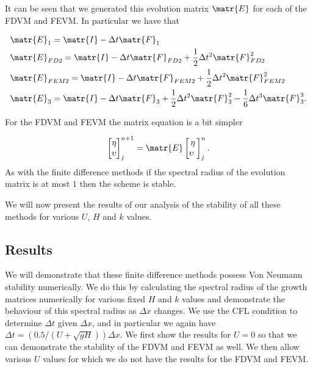 It can be seen that we generated this evolution matrix $\matr{E}$ for each of the FDVM and FEVM. In particular we have that

\begin{align*}
&\matr{E}_{1} = \matr{I} - \Delta t \matr{F}_1 \\
&\matr{E}_{FD2} = \matr{I} - \Delta t \matr{F}_{FD2} + \frac{1}{2} \Delta t^2 \matr{F}_{FD2}^2 \\
&\matr{E}_{FEM2} =  \matr{I} - \Delta t \matr{F}_{FEM2} + \frac{1}{2} \Delta t^2 \matr{F}_{FEM2}^2\\
&\matr{E}_{3} = \matr{I} - \Delta t \matr{F}_{3} + \frac{1}{2} \Delta t^2 \matr{F}_3^2 - \frac{1}{6} \Delta t^3 \matr{F}_3^3. \\
\end{align*}

For the FDVM and FEVM the matrix equation is a bit simpler

\begin{equation}
\begin{bmatrix}
\eta \\
\upsilon\\
\end{bmatrix}^{n+1}_j = \matr{E}  \begin{bmatrix}
\eta\\
\upsilon\
\end{bmatrix}^{n}_j .
\end{equation}
As with the finite difference methods if the spectral radius of the evolution matrix is at most $1$ then the scheme is stable.

We will now present the results of our analysis of the stability of all these methods for various $U$, $H$ and $k$ values. 

\subsection{Results}
We will demonstrate that these finite difference methods possess Von Neumann stability numerically. We do this by calculating the spectral radius of the growth matrices numerically for various fixed $H$ and $k$ values and demonstrate the behaviour of this spectral radius as $\Delta x$ changes. We use the CFL condition to determine $\Delta t$ given $\Delta x$, and in particular we again have $\Delta t =   \left( 0.5 / \left(U + \sqrt{gH}\right) \right) {\Delta x} $. We first show the results for $U = 0$ so that we  can demonstrate the stability of the FDVM and FEVM as well. We then allow various $U$ values for which we do not have the results for the FDVM and FEVM.

